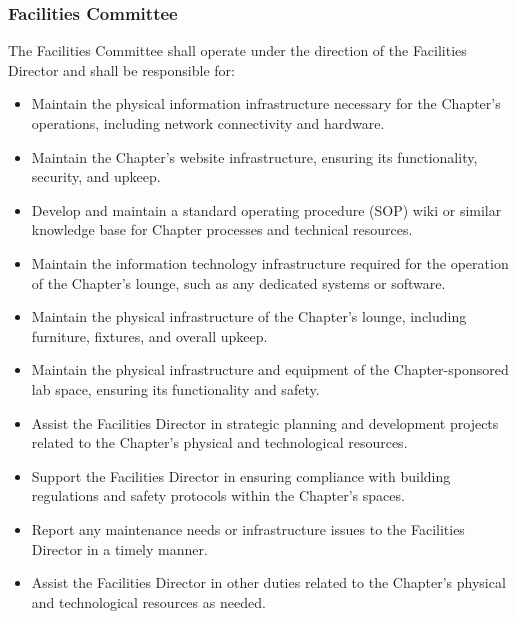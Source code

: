 \documentclass[10pt, oneside]{article}
\begin{document}
\subsubsection{Facilities Committee}
The Facilities Committee shall operate under the direction of the Facilities Director and shall be responsible for:
\begin{itemize}
    \item Maintain the physical information infrastructure necessary for the Chapter's operations, including network connectivity and hardware.
    \item Maintain the Chapter's website infrastructure, ensuring its functionality, security, and upkeep.
    \item Develop and maintain a standard operating procedure (SOP) wiki or similar knowledge base for Chapter processes and technical resources.
    \item Maintain the information technology infrastructure required for the operation of the Chapter's lounge, such as any dedicated systems or software.
    \item Maintain the physical infrastructure of the Chapter's lounge, including furniture, fixtures, and overall upkeep.
    \item Maintain the physical infrastructure and equipment of the Chapter-sponsored lab space, ensuring its functionality and safety.
    \item Assist the Facilities Director in strategic planning and development projects related to the Chapter's physical and technological resources.
    \item Support the Facilities Director in ensuring compliance with building regulations and safety protocols within the Chapter's spaces.
    \item Report any maintenance needs or infrastructure issues to the Facilities Director in a timely manner.
    \item Assist the Facilities Director in other duties related to the Chapter's physical and technological resources as needed.
\end{itemize}
\end{document}
